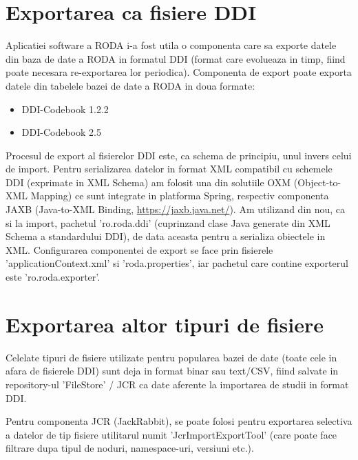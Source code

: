 \section{Exportarea ca fisiere DDI}
Aplicatiei software a RODA i-a fost utila o componenta care sa exporte datele din baza de date a RODA in formatul DDI (format care evolueaza in timp, fiind poate necesara re-exportarea lor periodica).
Componenta de export poate exporta datele din tabelele bazei de date a RODA in doua formate:
\begin{itemize}
\item DDI-Codebook 1.2.2
\item DDI-Codebook 2.5
\end{itemize}

Procesul de export al fisierelor DDI este, ca schema de principiu, unul invers celui de import.
Pentru serializarea datelor in format XML compatibil cu schemele DDI (exprimate in XML Schema) 
am folosit una din solutiile OXM (Object-to-XML Mapping) ce sunt integrate in platforma Spring, respectiv componenta JAXB (Java-to-XML Binding, \url{https://jaxb.java.net/}).
Am utilizand din nou, ca si la import, pachetul 'ro.roda.ddi' (cuprinzand clase Java generate din XML Schema a standardului DDI), de data aceasta pentru a serializa obiectele in XML. 
Configurarea componentei de export se face prin fisierele 'applicationContext.xml' si 'roda.properties', iar pachetul care contine exporterul este 'ro.roda.exporter'.

\section{Exportarea altor tipuri de fisiere}
Celelate tipuri de fisiere utilizate pentru popularea bazei de date (toate cele in afara de fisierele DDI) sunt deja in format binar sau text/CSV, 
fiind salvate in repository-ul 'FileStore' / JCR ca date aferente la importarea de studii in format DDI.

Pentru componenta JCR (JackRabbit), 
se poate folosi pentru exportarea selectiva a datelor de tip fisiere utilitarul numit 'JcrImportExportTool' 
(care poate face filtrare dupa tipul de noduri, namespace-uri, versiuni etc.).